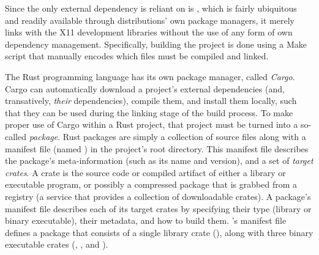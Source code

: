 Since the only external dependency \wmcpp is reliant on is , which
is fairly ubiquitous and readily available through distributions' own package
managers, it merely links with the X11 development libraries without the use
of any form of own dependency management. Specifically, building the project
is done using a \textup{Make} script that manually encodes which files must be
compiled and linked.





The Rust programming language has its own package manager, called
\textit{Cargo}. \textup{Cargo} can automatically download a project's external
dependencies (and, transatively, \textit{their} dependencies), compile them, and
install them locally, such that they can be used during the linking stage of the
build process\cite{thecargobook}. To make proper use of \textup{Cargo} within
a Rust project, that project must be turned into a so-called \textit{package}.
Rust packages are simply a collection of source files along with a manifest
file (named ) in the project's root directory. This manifest
file describes the package's meta-information (such as its name and version),
and a set of \textit{target crates}\cite{thecargobook}. A crate is the source
code or compiled artifact of either a library or executable program, or possibly
a compressed package that is grabbed from a registry (a service that provides
a collection of downloadable crates)\cite{thecargobook}. A package's manifest
file describes each of its target crates by specifying their type (library or
binary executable), their metadata, and how to build them\cite{thecargobook}.
\wmrs's manifest file defines a package that consists of a single library
crate (), along with three binary executable crates (,
, and ).


